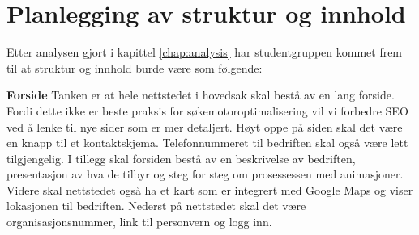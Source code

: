 









\section{Planlegging av struktur og innhold}

Etter analysen gjort i kapittel \ref{chap:analysis} har studentgruppen kommet frem til at struktur og innhold burde være som følgende: 

\textbf{Forside} Tanken er at hele nettstedet i hovedsak skal bestå av en lang forside. Fordi dette ikke er beste praksis for søkemotoroptimalisering vil vi forbedre SEO ved å lenke til nye sider som er mer detaljert. Høyt oppe på siden skal det være en knapp til et kontaktskjema. Telefonnummeret til bedriften skal også være lett tilgjengelig. I tillegg skal forsiden bestå av en beskrivelse av bedriften, presentasjon av hva de tilbyr og steg for steg om prosessessen med animasjoner. Videre skal nettstedet også ha et kart som er integrert med Google Maps og viser lokasjonen til bedriften. Nederst på nettstedet skal det være organisasjonsnummer, link til personvern og logg inn.

